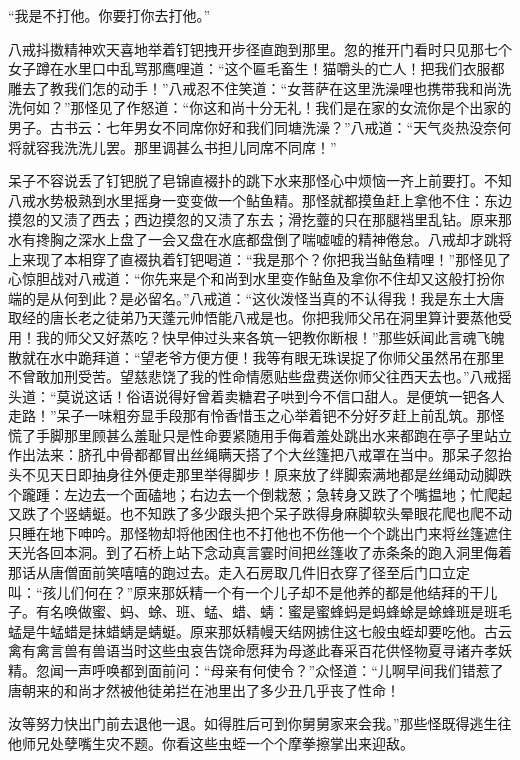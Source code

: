 \documentclass[12pt,UTF8]{ctexbook}
\begin{document}
“我是不打他。你要打你去打他。”

八戒抖擞精神欢天喜地举着钉钯拽开步径直跑到那里。忽的推开门看时只见那七个女子蹲在水里口中乱骂那鹰哩道：“这个匾毛畜生！猫嚼头的亡人！把我们衣服都雕去了教我们怎的动手！”八戒忍不住笑道：“女菩萨在这里洗澡哩也携带我和尚洗洗何如？”那怪见了作怒道：“你这和尚十分无礼！我们是在家的女流你是个出家的男子。古书云：七年男女不同席你好和我们同塘洗澡？”八戒道：“天气炎热没奈何将就容我洗洗儿罢。那里调甚么书担儿同席不同席！”

呆子不容说丢了钉钯脱了皂锦直裰扑的跳下水来那怪心中烦恼一齐上前要打。不知八戒水势极熟到水里摇身一变变做一个鲇鱼精。那怪就都摸鱼赶上拿他不住：东边摸忽的又渍了西去；西边摸忽的又渍了东去；滑扢虀的只在那腿裆里乱钻。原来那水有搀胸之深水上盘了一会又盘在水底都盘倒了喘嘘嘘的精神倦怠。八戒却才跳将上来现了本相穿了直裰执着钉钯喝道：“我是那个？你把我当鲇鱼精哩！”那怪见了心惊胆战对八戒道：“你先来是个和尚到水里变作鲇鱼及拿你不住却又这般打扮你端的是从何到此？是必留名。”八戒道：“这伙泼怪当真的不认得我！我是东土大唐取经的唐长老之徒弟乃天蓬元帅悟能八戒是也。你把我师父吊在洞里算计要蒸他受用！我的师父又好蒸吃？快早伸过头来各筑一钯教你断根！”那些妖闻此言魂飞魄散就在水中跪拜道：“望老爷方便方便！我等有眼无珠误捉了你师父虽然吊在那里不曾敢加刑受苦。望慈悲饶了我的性命情愿贴些盘费送你师父往西天去也。”八戒摇头道：“莫说这话！俗语说得好曾着卖糖君子哄到今不信口甜人。是便筑一钯各人走路！”呆子一味粗夯显手段那有怜香惜玉之心举着钯不分好歹赶上前乱筑。那怪慌了手脚那里顾甚么羞耻只是性命要紧随用手侮着羞处跳出水来都跑在亭子里站立作出法来：脐孔中骨都都冒出丝绳瞒天搭了个大丝篷把八戒罩在当中。那呆子忽抬头不见天日即抽身往外便走那里举得脚步！原来放了绊脚索满地都是丝绳动动脚跌个躘踵：左边去一个面磕地；右边去一个倒栽葱；急转身又跌了个嘴揾地；忙爬起又跌了个竖蜻蜓。也不知跌了多少跟头把个呆子跌得身麻脚软头晕眼花爬也爬不动只睡在地下呻吟。那怪物却将他困住也不打他也不伤他一个个跳出门来将丝篷遮住天光各回本洞。到了石桥上站下念动真言霎时间把丝篷收了赤条条的跑入洞里侮着那话从唐僧面前笑嘻嘻的跑过去。走入石房取几件旧衣穿了径至后门口立定叫：“孩儿们何在？”原来那妖精一个有一个儿子却不是他养的都是他结拜的干儿子。有名唤做蜜、蚂、蜍、班、蜢、蜡、蜻：蜜是蜜蜂蚂是蚂蜂蜍是蜍蜂班是班毛蜢是牛蜢蜡是抹蜡蜻是蜻蜓。原来那妖精幔天结网掳住这七般虫蛭却要吃他。古云禽有禽言兽有兽语当时这些虫哀告饶命愿拜为母遂此春采百花供怪物夏寻诸卉孝妖精。忽闻一声呼唤都到面前问：“母亲有何使令？”众怪道：“儿啊早间我们错惹了唐朝来的和尚才然被他徒弟拦在池里出了多少丑几乎丧了性命！

汝等努力快出门前去退他一退。如得胜后可到你舅舅家来会我。”那些怪既得逃生往他师兄处孽嘴生灾不题。你看这些虫蛭一个个摩拳擦掌出来迎敌。
\end{document}
